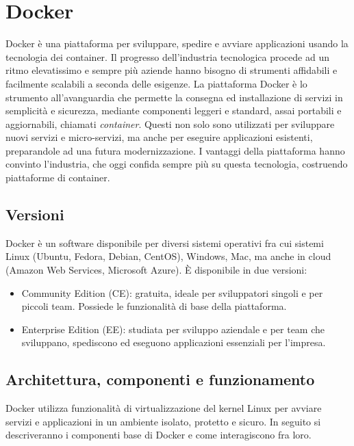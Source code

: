 \chapter{Docker}
\label{Docker}
\thispagestyle{empty}

Docker \cite{docker} è una piattaforma per sviluppare, spedire e avviare applicazioni usando la tecnologia dei container. Il progresso dell'industria tecnologica procede ad un ritmo elevatissimo e sempre più aziende hanno bisogno di strumenti affidabili e facilmente scalabili a seconda delle esigenze. La piattaforma Docker è lo strumento all'avanguardia che permette la consegna ed installazione di servizi in semplicità e sicurezza, mediante componenti leggeri e standard, assai portabili e aggiornabili, chiamati \emph{container}. Questi non solo sono utilizzati per sviluppare nuovi servizi e micro-servizi, ma anche per eseguire applicazioni esistenti, preparandole ad una futura modernizzazione. I vantaggi della piattaforma hanno convinto l'industria, che oggi confida sempre più su questa tecnologia, costruendo piattaforme di container.

\section{Versioni}
Docker è un software disponibile per diversi sistemi operativi fra cui sistemi Linux (Ubuntu, Fedora, Debian, CentOS), Windows, Mac, ma anche in cloud (Amazon Web Services, Microsoft Azure). È disponibile in due versioni:
\begin{itemize}
    \item Community Edition (CE): gratuita, ideale per sviluppatori singoli e per piccoli team. Possiede le funzionalità di base della piattaforma.
    \item Enterprise Edition (EE): studiata per sviluppo aziendale e per team che sviluppano, spediscono ed eseguono applicazioni essenziali per l'impresa.
\end{itemize}

\section{Architettura, componenti e funzionamento}
Docker \cite{docker_doc} utilizza funzionalità di virtualizzazione del kernel Linux per avviare servizi e applicazioni in un ambiente isolato, protetto e sicuro. In seguito si descriveranno i componenti base di Docker e come interagiscono fra loro.

